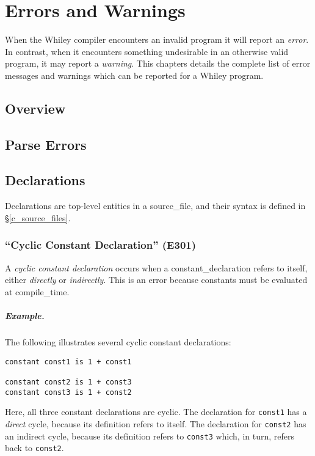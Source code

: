 \chapter{Errors and Warnings}

When the Whiley compiler encounters an invalid program it will report an {\em error}.  In contrast, when it encounters something undesirable in an otherwise valid program, it may report a {\em warning}.  This chapters details the complete list of error messages and warnings which can be reported for a Whiley program.

\section{Overview}

\section{Parse Errors}

\section{Declarations}

Declarations are top-level entities in a \gls{source_file}, and their syntax is defined in \S\ref{c_source_files}.

\subsection{``Cyclic Constant Declaration'' (E301)}

A {\em cyclic constant declaration} occurs when a \gls{constant_declaration} refers to itself, either {\em directly} or {\em indirectly}.  This is an error because constants must be evaluated at \gls{compile_time}.

\paragraph{Example.}  The following illustrates several cyclic constant declarations:

\begin{lstlisting}
constant const1 is 1 + const1

constant const2 is 1 + const3
constant const3 is 1 + const2
\end{lstlisting}
Here, all three constant declarations are cyclic.  The declaration for \lstinline{const1} has a {\em direct} cycle, because its definition refers to itself.  The declaration for \lstinline{const2} has an indirect cycle, because its definition refers to \lstinline{const3} which, in turn, refers back to \lstinline{const2}.

